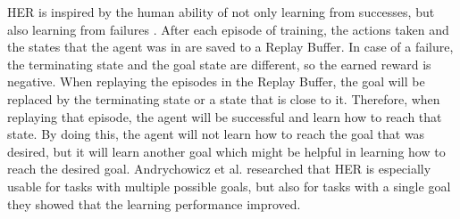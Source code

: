 \vspace{0.5cm}

HER is inspired by the human ability of not only learning from successes, but also learning from failures \cite{herpaper}. After each episode of training, the actions taken and the states that the agent was in are saved to a Replay Buffer. In case of a failure, the terminating state and the goal state are different, so the earned reward is negative. When replaying the episodes in the Replay Buffer, the goal will be replaced by the terminating state or a state that is close to it. Therefore, when replaying that episode, the agent will be successful and learn how to reach that state. By doing this, the agent will not learn how to reach the goal that was desired, but it will learn another goal which might be helpful in learning how to reach the desired goal. Andrychowicz et al. \cite{herpaper} researched that HER is especially usable for tasks with multiple possible goals, but also for tasks with a single goal they showed that the learning performance improved.

\vspace{0.5cm}

